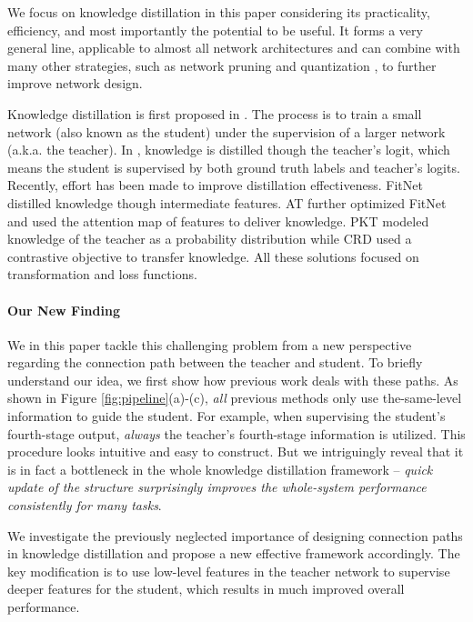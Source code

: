 \documentclass[final]{cvpr}
\begin{document}
We focus on knowledge distillation in this paper considering its practicality, efficiency, and most importantly the potential to be useful. It forms a very general line, applicable to almost all network architectures and can combine with many other strategies, such as network pruning and quantization \cite{quanmimic}, to further improve network design.

Knowledge distillation is first proposed in \cite{kd}. The process is to train a small network (also known as the student) under the supervision of a larger network (a.k.a. the teacher). In \cite{kd}, knowledge is distilled though the teacher's logit, which means the student is supervised by both ground truth labels and teacher's logits. Recently, effort has been made to improve distillation effectiveness. FitNet \cite{fitnet} distilled knowledge though intermediate features. AT \cite{at} further optimized FitNet and used the attention map of features to deliver knowledge. PKT \cite{pkt} modeled knowledge of the teacher as a probability distribution while CRD \cite{crd} used a contrastive objective to transfer knowledge. All these solutions focused on transformation and loss functions. 


\vspace{-0.1in} \paragraph{Our New Finding} We in this paper tackle this challenging problem from a new perspective regarding the connection path between the teacher and student. To briefly understand our idea, we first show how previous work deals with these paths. As shown in Figure \ref{fig:pipeline}(a)-(c), {\it all} previous methods only use the-same-level information to guide the student. For example, when supervising the student's fourth-stage output, {\it always} the teacher's fourth-stage information is utilized. This procedure looks intuitive and easy to construct. But we intriguingly reveal that it is in fact a bottleneck in the whole knowledge distillation framework -- {\it quick update of the structure surprisingly improves the whole-system performance consistently for many tasks}.

We investigate the previously neglected importance of designing connection paths in knowledge distillation and propose a new effective framework accordingly. The key modification is to use low-level features in the teacher network to supervise deeper features for the student, which results in much improved overall performance. 
\end{document}
